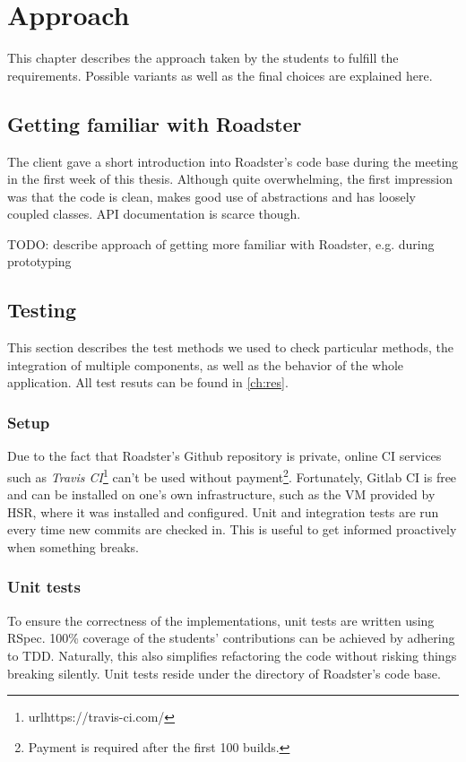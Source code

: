 \chapter{Approach}
This chapter describes the approach taken by the students to fulfill the
requirements. Possible variants as well as the final choices are explained here.

\section{Getting familiar with Roadster}
The client gave a short introduction into Roadster's code base during the meeting in the first
week of this thesis. Although quite overwhelming, the first impression was that
the code is clean, makes good use of abstractions and has loosely coupled
classes. API documentation is scarce though.

TODO: describe approach of getting more familiar with Roadster, e.g. during prototyping

\section{Testing}
This section describes the test methods we used to check particular methods,
the integration of multiple components, as well as the behavior of the whole application.
All test resuts can be found in \autoref{ch:res}.

\subsection{Setup}
Due to the fact that Roadster's Github repository is private, online \gls{CI}
services such as \emph{Travis
CI}\footnote{url{https://travis-ci.com/}} can't be used without
payment\footnote{Payment is required after the first 100 builds.}. Fortunately,
Gitlab CI is free and can be installed on one's own infrastructure, such as the
\gls{VM} provided by HSR, where it was installed and configured. Unit and
integration tests are run every time new commits are checked in. This is useful
to get informed proactively when something breaks.

\subsection{Unit tests}
To ensure the correctness of the implementations, unit tests are written using
RSpec. 100\% coverage of the students' contributions can be achieved by
adhering to \gls{TDD}. Naturally, this also simplifies refactoring the code
without risking things breaking silently. Unit tests reside under the 
directory of Roadster's code base.

